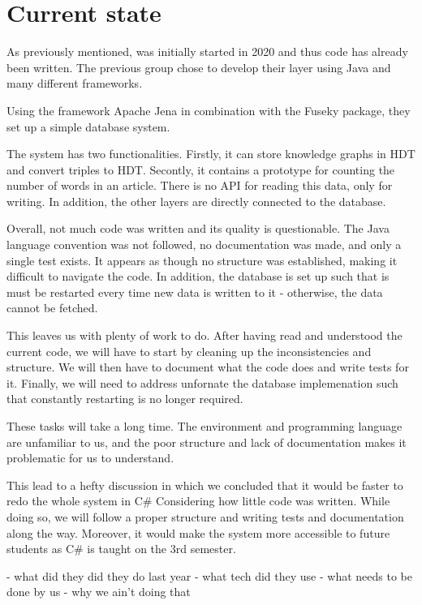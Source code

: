 \section{Current state}

As previously mentioned, \knox{} was initially started in 2020 and thus code has already been written.
The previous group chose to develop their layer using Java and many different frameworks.

Using the framework Apache Jena in combination with the Fuseky package, they set up a simple database system.

The system has two functionalities. 
Firstly, it can store knowledge graphs in HDT and convert triples to HDT.
Secontly, it contains a prototype for counting the number of words in an article.
There is no API for reading this data, only for writing. 
In addition, the other layers are directly connected to the database.

Overall, not much code was written and its quality is questionable. 
The Java language convention was not followed, no documentation was made, and only a single test exists. 
It appears as though no structure was established, making it difficult to navigate the code. 
In addition, the database is set up such that is must be restarted every time new data is written to it - otherwise, the data cannot be fetched.

This leaves us with plenty of work to do.
After having read and understood the current code, we will have to start by cleaning up the inconsistencies and structure.
We will then have to document what the code does and write tests for it.
Finally, we will need to address unfornate the database implemenation such that constantly restarting is no longer required.

These tasks will take a long time.
The environment and programming language are unfamiliar to us, and the poor structure and lack of documentation makes it problematic for us to understand.

This lead to a hefty discussion in which we concluded that it would be faster to redo the whole system in C# Considering how little code was written. 
While doing so, we will follow a proper structure and writing tests and documentation along the way. 
Moreover, it would make the system more accessible to future students as C# is taught on the 3rd semester.  

- what did they did they do last year
- what tech did they use
- what needs to be done by us
- why we ain't doing that